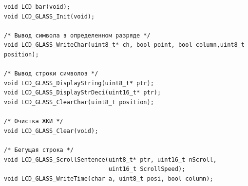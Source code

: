 \begin{verbatim}
void LCD_bar(void);
void LCD_GLASS_Init(void);

/* Вывод символа в определенном разряде */ 
void LCD_GLASS_WriteChar(uint8_t* ch, bool point, bool column,uint8_t position);

/* Вывод строки символов */ 
void LCD_GLASS_DisplayString(uint8_t* ptr);
void LCD_GLASS_DisplayStrDeci(uint16_t* ptr);
void LCD_GLASS_ClearChar(uint8_t position);

/* Очистка ЖКИ */ 
void LCD_GLASS_Clear(void);

/* Бегущая строка */ 
void LCD_GLASS_ScrollSentence(uint8_t* ptr, uint16_t nScroll, 
                              uint16_t ScrollSpeed);
void LCD_GLASS_WriteTime(char a, uint8_t posi, bool column);
\end{verbatim}
